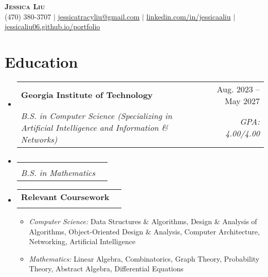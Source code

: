 \documentclass[letterpaper,11pt]{article}
\makeatletter
\newcommand{\resumeItem}[1]{
  \item\small{
    {#1 \vspace{-2pt}}
  }
}
\newcommand{\resumeSubheading}[4]{
  \vspace{-2pt}\item
    \begin{tabular*}{0.97\textwidth}[t]{l@{\extracolsep{\fill}}r}
      \textbf{#1} & #2 \\
      \textsl{\small#3} & \textsl{\small #4} \\
    \end{tabular*}\vspace{-7pt}
}
\newcommand{\resumeSubHeadingListStart}{\begin{itemize}[leftmargin=*, label={}]}
\newcommand{\resumeSubHeadingListEnd}{\end{itemize}}
\newcommand{\resumeItemListStart}{\begin{itemize}[leftmargin=*, labelsep=0.75em]}
\newcommand{\resumeItemListEnd}{\end{itemize}\vspace{-7pt}}
\makeatother
\begin{document}

\begin{center}
    \textbf{\Huge \scshape Jessica Liu} \\ \vspace{1pt}
    \small 
        (470) 380-3707 $|$
        \href{mailto:jessicatracyliu@gmail.com}{jessicatracyliu@gmail.com} $|$
        \href{https://www.linkedin.com/in/jessicaaliu/}{linkedin.com/in/jessicaaliu} $|$
        \href{https://jessicaliu06.github.io/portfolio}{jessicaliu06.github.io/portfolio}
\end{center}

\vspace{-0.75cm}
\section{Education}
  \resumeSubHeadingListStart
    \resumeSubheading
      {Georgia Institute of Technology}{Aug. 2023 -- May 2027}
      {B.S. in Computer Science (Specializing in Artificial Intelligence and Information \& Networks)}{GPA: 4.00/4.00}
    \vspace{-0.575cm}
    \resumeSubheading
      {}{}
      {B.S. in Mathematics}{}

    \vspace{0.1cm}
    \resumeSubheading
      {Relevant Coursework}{}
      {}{}
      \vspace{-0.5cm}
      \resumeItemListStart
        \resumeItem
            {\textsl{Computer Science:} Data Structures \& Algorithms, Design \& Analysis of Algorithms, Object-Oriented Design \& Analysis, Computer Architecture, Networking, Artificial Intelligence}
        \resumeItem
            {\textsl{Mathematics:} Linear Algebra, Combinatorics, Graph Theory, Probability Theory, Abstract Algebra, Differential Equations}
      \resumeItemListEnd
  \resumeSubHeadingListEnd

\end{document}

